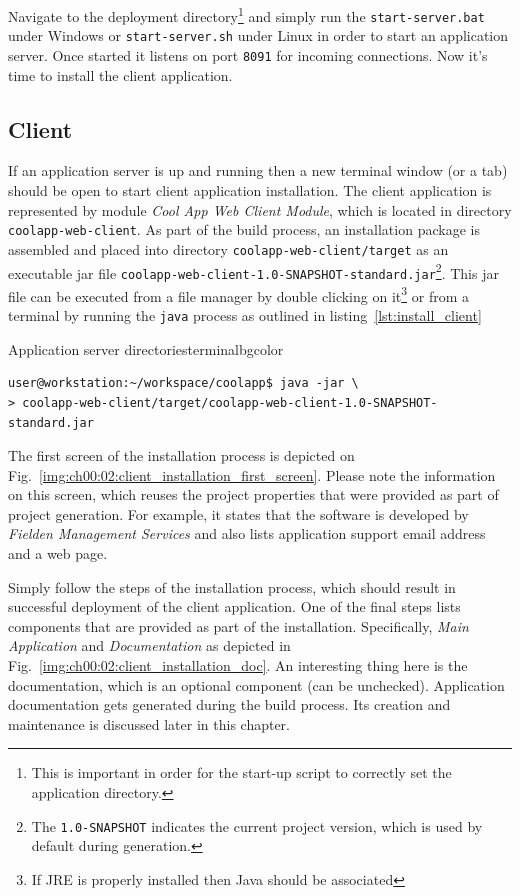   Navigate to the deployment directory\footnote{This is important in order for the start-up script to correctly set the application directory.} and simply run the \texttt{start-server.bat} under Windows or \texttt{start-server.sh} under Linux in order to start an application server.
  Once started it listens on port \texttt{8091} for incoming connections.
  Now it's time to install the client application.

\subsection{Client}
  \sloppypar
  If an application server is up and running then a new terminal window (or a tab) should be open to start client application installation.
  The client application is represented by module \emph{Cool App Web Client Module}, which is located in directory \texttt{coolapp-web-client}.
  As part of the build process, an installation package is assembled and placed into directory \texttt{coolapp-web-client/target} as an executable jar file \texttt{coolapp-web-client-1.0-SNAPSHOT-standard.jar}\footnote{The \texttt{1.0-SNAPSHOT} indicates the current project version, which is used by default during generation.}.   
  This jar file can be executed from a file manager by double clicking on it\footnote{If JRE is properly installed then Java should be associated} or from a terminal by running the \texttt{java} process as outlined in listing~\ref{lst:install_client}

  \begin{code}{Application server directories}{\label{lst:install_client}}{terminalbgcolor}
     \begin{lstlisting}
user@workstation:~/workspace/coolapp$ java -jar \
> coolapp-web-client/target/coolapp-web-client-1.0-SNAPSHOT-standard.jar
     \end{lstlisting}
  \end{code}

  The first screen of the installation process is depicted on Fig.~\ref{img:ch00:02:client_installation_first_screen}.
  Please note the information on this screen, which reuses the project properties that were provided as part of project generation.
  For example, it states that the software is developed by \emph{Fielden Management Services} and also lists application support email address and a web page.
  
  Simply follow the steps of the installation process, which should result in successful deployment of the client application.
  One of the final steps lists components that are provided as part of the installation.
  Specifically, \emph{Main Application} and \emph{Documentation} as depicted in Fig.~\ref{img:ch00:02:client_installation_doc}.
  An interesting thing here is the documentation, which is an optional component (can be unchecked).
  Application documentation gets generated during the build process.
  Its creation and maintenance is discussed later in this chapter.

